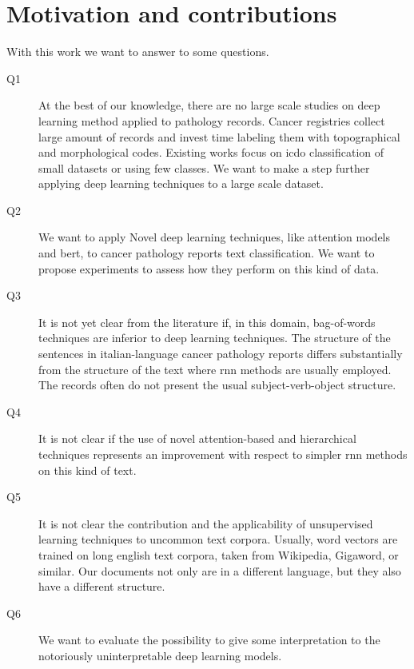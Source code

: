 \section{Motivation and contributions}\label{sec:motivation}
With this work we want to answer to some questions.
\begin{description}
\item[Q1] At the best of our
  knowledge, there are no large scale studies on deep learning method
  applied to pathology records. Cancer registries collect large amount of
  records and invest time labeling them with topographical and
  morphological codes. Existing works focus on \ac{icdo} classification
  of small datasets or using few 
  classes. We want to make a step further applying deep learning
  techniques to a large scale dataset.
\item[Q2] We want to apply Novel deep learning techniques, like
  attention models and \ac{bert}, to cancer pathology reports text
  classification. We want to propose
  experiments to assess how they perform on this kind of data.
\item[Q3] It is not yet clear from the literature if, in this domain,
  bag-of-words techniques are inferior to deep learning
  techniques. The structure of the sentences in italian-language 
  cancer pathology reports differs substantially from the structure of the text
  where \ac{rnn} methods are usually employed. The records often
  do not present the usual subject-verb-object structure.
\item[Q4] It is not clear if the use of novel attention-based and
  hierarchical techniques 
  represents an improvement with respect to simpler \ac{rnn} methods on this
  kind of text. 
\item[Q5] It is not clear the contribution and the applicability of
  unsupervised learning techniques to uncommon text corpora. Usually,
  word vectors are trained on long english text corpora, taken from
  Wikipedia, Gigaword, or similar. Our documents not only are in a
  different language, but they also have a different structure.
\item[Q6] We want to evaluate the possibility to give
  some interpretation to the notoriously uninterpretable deep learning
  models. 
\end{description}


